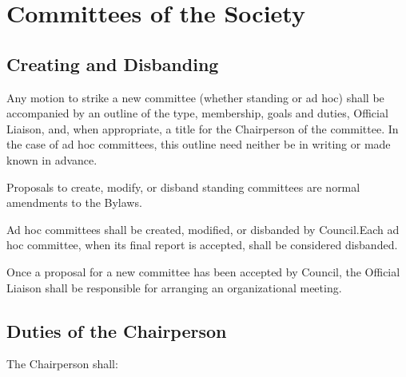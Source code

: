 
\section{Committees of the Society}
\subsection{Creating and Disbanding}
\begin{longenum}[ label*=\thesubsection.\arabic*., align=left]
	\item Any motion to strike a new committee (whether standing or ad hoc) shall be accompanied by an outline of the type, membership, goals and duties, Official Liaison, and, when appropriate, a title for the Chairperson of the committee. In the case of ad hoc committees, this outline need neither be in writing or made known in advance. 
    \item Proposals to create, modify, or disband standing committees are normal amendments to the Bylaws.
    \item Ad hoc committees shall be created, modified, or disbanded by Council.Each ad hoc committee, when its final report is accepted, shall be considered disbanded.
    \item Once a proposal for a new committee has been accepted by Council, the Official Liaison shall be responsible for arranging an organizational meeting. 
\end{longenum}

\subsection{Duties of the Chairperson}
The Chairperson shall:

